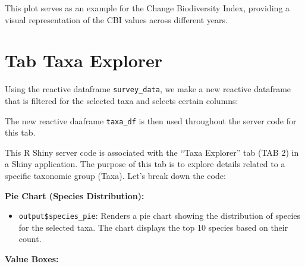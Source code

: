 \documentclass[
]{book}
\newenvironment{Shaded}{\begin{snugshade}}{\end{snugshade}}
\newcommand{\CommentTok}[1]{\textcolor[rgb]{0.56,0.35,0.01}{\textit{#1}}}
\newcommand{\FunctionTok}[1]{\textcolor[rgb]{0.13,0.29,0.53}{\textbf{#1}}}
\newcommand{\NormalTok}[1]{#1}
\newcommand{\OtherTok}[1]{\textcolor[rgb]{0.56,0.35,0.01}{#1}}
\newcommand{\SpecialCharTok}[1]{\textcolor[rgb]{0.81,0.36,0.00}{\textbf{#1}}}
\providecommand{\tightlist}{%
  \setlength{\itemsep}{0pt}\setlength{\parskip}{0pt}}
\begin{document}
This plot serves as an example for the Change Biodiversity Index, providing a visual representation of the CBI values across different years.

\hypertarget{tab-taxa-explorer}{%
\section{Tab Taxa Explorer}\label{tab-taxa-explorer}}

Using the reactive dataframe \texttt{survey\_data}, we make a new reactive dataframe that is filtered for the selected taxa and selects certain columns:

\begin{Shaded}
\end{Shaded}

The new reactive daaframe \texttt{taxa\_df} is then used throughout the server code for this tab.

This R Shiny server code is associated with the ``Taxa Explorer'' tab (TAB 2) in a Shiny application. The purpose of this tab is to explore details related to a specific taxonomic group (Taxa). Let's break down the code:

\textbf{Pie Chart (Species Distribution):}

\begin{itemize}
\tightlist
\item
  \texttt{output\$species\_pie}: Renders a pie chart showing the distribution of species for the selected taxa. The chart displays the top 10 species based on their count.
\end{itemize}

\textbf{Value Boxes:}
\end{document}
